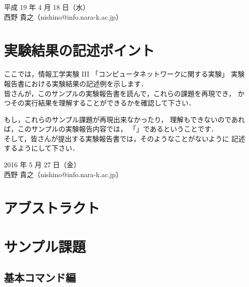 \documentclass[a4j]{jreport}
\begin{document}
%
%
\begin{flushright}
平成 19 年 4 月 18 日（水）\\
西野 貴之（nishino@info.nara-k.ac.jp）
\end{flushright}


\chapter*{実験結果の記述ポイント}

ここでは，情報工学実験 III 「コンピュータネットワークに関する実験」
実験報告書における実験結果の記述例を示します．\\

皆さんが，このサンプルの実験報告書を読んで，これらの課題を再現でき，
かつその実行結果を理解することができるかを確認して下さい．

もし，これらのサンプル課題が再現出来なかったり，
理解もできないのであれば，このサンプルの実験報告内容では，
「」であるということです．\\	%

そして，皆さんが提出する実験報告書では，そのようなことがないように
記述するようにして下さい．

%
%
\begin{flushright}
2016 年 5 月 27 日（金）\\
西野 貴之（nishino@info.nara-k.ac.jp）
\end{flushright}

\chapter*{アブストラクト}



\chapter{サンプル課題}
\section{基本コマンド編}
\end{document}
